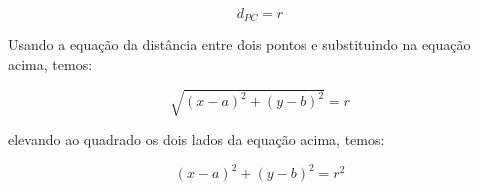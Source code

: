 $$ d_{PC} = r $$

\begin{center}

Usando a equação da distância entre dois pontos e substituindo na equação acima, temos:

\end{center}
$$\sqrt{{(x - a)}^2 + {(y - b)}^2} = r $$

\begin{center}

elevando ao quadrado os dois lados da equação acima, temos:

\end{center}

$$ {(x - a)}^2 + {(y - b)}^2 = r^2$$